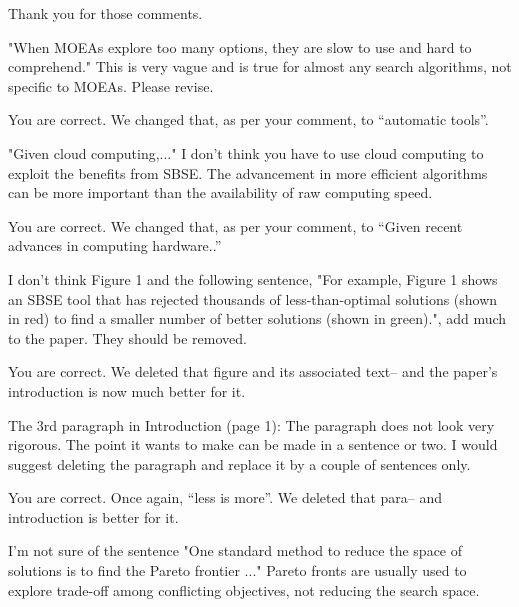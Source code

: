 \documentclass[10pt,journal,compsoc]{IEEEtran}
\newenvironment{changed}{\par\color{MyDarkBlue}}{\par}
\begin{document}
\begin{changed}
Thank you for those comments.
\end{changed}

"When MOEAs explore too many options, they are slow to use and hard to
comprehend." This is very vague and is true for almost any search
algorithms, not specific to MOEAs. Please revise.



\begin{changed}
You are correct. We changed that, as per your comment, to ``automatic tools''.
\end{changed}


"Given cloud computing,..." I don't think you have to use cloud
computing to exploit the benefits from SBSE. The advancement in more
efficient algorithms can be more important than the availability of raw
computing speed.


\begin{changed}
You are correct. We changed that, as per your comment, to ``Given recent advances in computing hardware..''
\end{changed}

I don't think Figure 1 and the following sentence, "For example, Figure
1 shows an SBSE tool that has rejected thousands of less-than-optimal
solutions (shown in red) to find a smaller number of better solutions
(shown in green).", add much to the paper. They should be removed.


\begin{changed}
You are correct. We deleted that figure and its associated text-- and the paper's introduction is now much better for it.
\end{changed}

 The 3rd paragraph in Introduction (page 1): The paragraph
does not look very rigorous. The
point it wants to make can be made in a sentence or two. I would suggest
deleting the paragraph and replace it by a couple of sentences only.


\begin{changed}
You are correct. Once again, ``less is more''.
We deleted that para-- and introduction is better for it.
\end{changed}

I'm not sure of the sentence "One standard method to reduce the
space of solutions is to find the Pareto frontier ..." Pareto fronts are
usually used to explore trade-off among conflicting objectives, not
reducing the search space.
\end{document}
